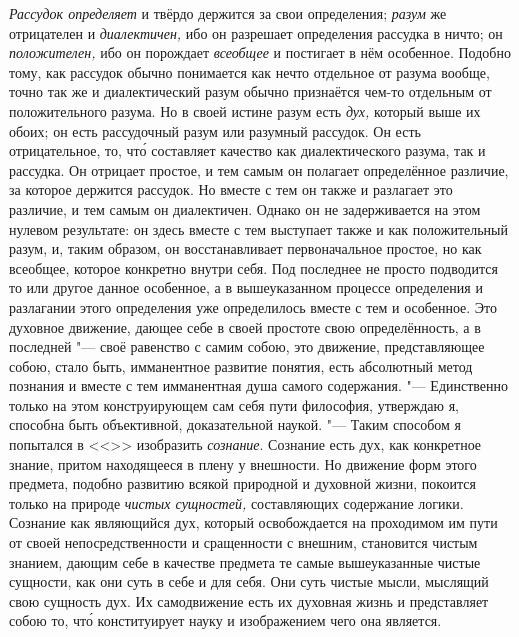 {\em Рассудок определяет} и твёрдо держится за свои определения; {\em разум} же
отрицателен и {\em диалектичен,} ибо он разрешает определения рассудка в ничто;
он {\em положителен,} ибо он порождает {\em всеобщее} и постигает в нём
особенное. Подобно тому, как рассудок обычно понимается как нечто отдельное от
разума вообще, точно так же и диалектический разум обычно признаётся чем-то
отдельным от положительного разума. Но в своей истине разум есть {\em дух,}
который выше их обоих; он есть рассудочный разум или разумный рассудок. Он есть
отрицательное, то, чт\'{о} составляет качество как диалектического разума, так
и рассудка. Он отрицает простое, и тем самым он полагает определённое различие,
за которое держится рассудок. Но вместе с тем он также и разлагает это
различие, и тем самым он диалектичен. Однако он не задерживается на этом
нулевом результате: он здесь вместе с тем выступает также и как положительный
разум, и, таким образом, он восстанавливает первоначальное простое, но как
всеобщее, которое конкретно внутри себя. Под последнее не просто подводится то
или другое данное особенное, а в вышеуказанном процессе определения и
разлагании этого определения уже определилось вместе с тем и особенное. Это
духовное движение, дающее себе в своей простоте свою определённость, а в
последней "--- своё равенство с самим собою, это движение, представляющее
собою, стало быть, имманентное развитие понятия, есть абсолютный метод познания
и вместе с тем имманентная душа самого содержания. "--- Единственно только на
этом конструирующем сам себя пути философия, утверждаю я, способна быть
объективной, доказательной наукой. "--- Таким способом я попытался в
<<>> изобразить {\em сознание}. Сознание есть дух, как
конкретное знание, притом находящееся в плену у внешности. Но движение форм
этого предмета, подобно развитию всякой природной и духовной жизни, покоится
только на природе {\em чистых сущностей,} составляющих содержание логики.
Сознание как являющийся дух, который освобождается на проходимом им пути от
своей непосредственности и сращенности с внешним, становится чистым знанием,
дающим себе в качестве предмета те самые вышеуказанные чистые сущности, как они
суть в себе и для себя. Они суть чистые мысли, мыслящий свою сущность дух. Их
самодвижение есть их духовная жизнь и представляет собою то, чт\'{о}
конституирует науку и изображением чего она является.

